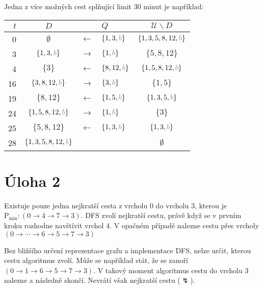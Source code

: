 \documentclass{article}
\newcommand{\U}{\mathcal{U}}
\newcommand{\myb}{{\color{gray} b}}
\newcommand{\Pmin}{\text{P}_\text{min}}
\begin{document}
Jedna z více možných cest splňující limit 30 minut je například:
\begin{center}
    \begin{tabular}{ r c c l c }
        $t$ & $D$                        &               & $Q$               & $\U \smallsetminus D$      \\
        \hline
        0   & $\emptyset$                & $\leftarrow$  & $\{1,3, \myb\}$   & $\{1, 3, 5, 8, 12, \myb\}$ \\[2mm]
        3   & $\{1, 3, \myb\}$           & $\rightarrow$ & $\{1, \myb\}$     & $\{5, 8, 12\}$             \\[2mm]
        4   & $\{3\}$                    & $\leftarrow$  & $\{8, 12, \myb\}$ & $\{1, 5, 8, 12, \myb\}$    \\[2mm]
        16  & $\{3, 8, 12, \myb\}$       & $\rightarrow$ & $\{3, \myb\}$     & $\{1, 5\}$                 \\[2mm]
        19  & $\{8, 12\}$                & $\leftarrow$  & $\{1, 5, \myb\}$  & $\{1, 3, 5, \myb\}$        \\[2mm]
        24  & $\{1, 5, 8, 12, \myb\}$    & $\rightarrow$ & $\{1, \myb\}$     & $\{3\}$                    \\[2mm]
        25  & $\{5, 8, 12\}$             & $\leftarrow$  & $\{1,3, \myb\}$   & $\{1, 3, \myb\}$           \\[2mm]
        28  & $\{1, 3, 5, 8, 12, \myb\}$ &               &                   & $\emptyset$                \\[2mm]
    \end{tabular}
\end{center}

\section*{Úloha 2}

Existuje pouze jedna nejkratší cesta z vrcholu 0 do vrcholu 3, kterou je
\(
\Pmin: (0 \rightarrow 4 \rightarrow 7 \rightarrow 3).
\)
DFS zvolí nejkratší cestu, právě když se v prvním kroku rozhodne navštívit vrchol 4.
V opačném případě nalezne cestu přes vrcholy $(0 \rightarrow \cdots \rightarrow 6 \rightarrow 5 \rightarrow 7 \rightarrow 3)$

Bez bližšího určení reprezentace grafu a implementace DFS, nelze určit, kterou cestu algoritmus zvolí. Může se například stát, že se zanoří $(0 \rightarrow 1 \rightarrow 6 \rightarrow 5 \rightarrow 7 \rightarrow 3)$. V takový moment algoritmus cestu do vrcholu 3 nalezne a následně skončí. Nevrátí však nejkratší cestu ($\lightning$).
\end{document}
